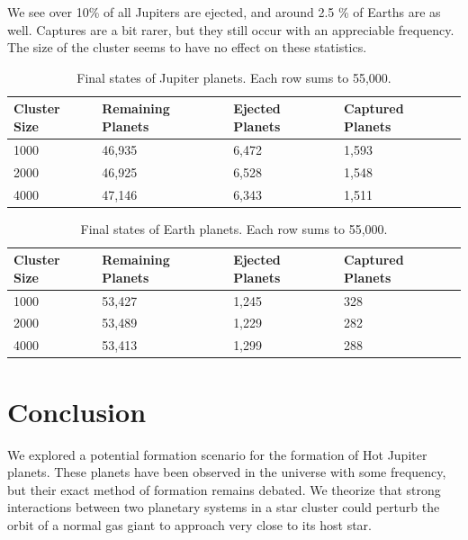 \documentclass[12pt]{article}
\begin{document}
    We see over 10\% of all Jupiters are ejected, and around 2.5 \% of Earths are
    as well. Captures are a bit rarer, but they still occur with an appreciable
    frequency. The size of the cluster seems to have no effect on these statistics.

    \begin{table}[H]
        \centering
        \caption{Final states of Jupiter planets. Each row sums to 55,000.}
        \vspace{0.2in}
        \begin{tabular}{|llll|}
            \hline
            \textbf{Cluster Size} & \textbf{Remaining Planets} & \textbf{Ejected Planets} & \textbf{Captured Planets} \\
            \hline
            1000 & 46,935 & 6,472 & 1,593 \\
            2000 & 46,925 & 6,528 & 1,548 \\
            4000 & 47,146 & 6,343 & 1,511 \\
            \hline
        \end{tabular}
    \end{table}

    \begin{table}[H]
        \centering
        \caption{Final states of Earth planets. Each row sums to 55,000.}
        \vspace{0.2in}
        \begin{tabular}{|llll|}
            \hline
            \textbf{Cluster Size} & \textbf{Remaining Planets} & \textbf{Ejected Planets} & \textbf{Captured Planets} \\
            \hline
            1000 & 53,427 & 1,245 & 328 \\
            2000 & 53,489 & 1,229 & 282 \\
            4000 & 53,413 & 1,299 & 288 \\
            \hline
        \end{tabular}
    \end{table}


\section{Conclusion}

We explored a potential formation scenario for the formation of Hot Jupiter
planets. These planets have been observed in the universe with some frequency,
but their exact method of formation remains debated. 
We theorize that strong interactions between two planetary systems in a star
cluster could perturb the orbit of a normal gas giant to approach very close to
its host star. 
\end{document}
